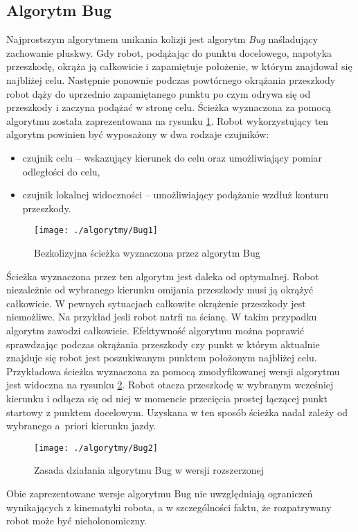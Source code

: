\subsection{Algorytm Bug}
	Najprostszym algorytmem unikania kolizji jest algorytm \emph{Bug} naśladujący zachowanie pluskwy. Gdy robot,
	podążając do punktu docelowego, napotyka przeszkodę, okrąża ją całkowicie i zapamiętuje położenie, w którym
	znajdował się najbliżej celu. Następnie ponownie podczas powtórnego okrążania przeszkody robot dąży do
	uprzednio zapamiętanego punktu po czym odrywa się od przeszkody i zaczyna podążać w stronę celu. Ścieżka
	wyznaczona za pomocą algorytmu została zaprezentowana na rysunku
	\ref{fig:Bug1}. Robot wykorzystujący ten algorytm powinien być wyposażony w dwa rodzaje czujników:
	\begin{itemize}
	\item czujnik celu -- wskazujący kierunek do celu oraz umożliwiający pomiar odległości do celu,
	\item czujnik lokalnej widoczności -- umożliwiający  podążanie wzdłuż konturu przeszkody. 
	\end{itemize}
	\begin{figure}[h]
	\centering
	\texttt{[image: ./algorytmy/Bug1]}
	\caption{ Bezkolizyjna ścieżka wyznaczona przez algorytm Bug }\label{fig:Bug1}
	\end{figure}
	Ścieżka wyznaczona przez ten algorytm jest daleka od optymalnej. Robot niezależnie od wybranego kierunku
	omijania przeszkody musi ją okrążyć całkowicie. W pewnych sytuacjach całkowite okrążenie przeszkody jest niemożliwe. Na przykład jesli robot natrfi na ścianę.
	W takim przypadku algorytm zawodzi całkowicie.
	Efektywność algorytmu można poprawić sprawdzając podczas okrążania przeszkody czy punkt w którym aktualnie
	znajduje  się robot jest poszukiwanym punktem położonym najbliżej celu. Przykładowa ścieżka
	wyznaczona za pomocą zmodyfikowanej wersji algorytmu jest widoczna na rysunku \ref{fig:Bug2}.
	Robot otacza przeszkodę w wybranym wcześniej kierunku i odłącza się od niej w momencie przecięcia
 	prostej łączącej punkt startowy z punktem docelowym. Uzyskana w ten sposób ścieżka nadal zależy od wybranego
	 a~priori kierunku jazdy.	
	\begin{figure}
	\centering
	\texttt{[image: ./algorytmy/Bug2]}
	\caption{Zasada działania algorytmu Bug w wersji rozszerzonej}\label{fig:Bug2}
	\end{figure}
	Obie zaprezentowane wersje algorytmu Bug nie uwzględniają ograniczeń wynikających z kinematyki robota, a w
	szczególności faktu, że rozpatrywany robot może być nieholonomiczny.
